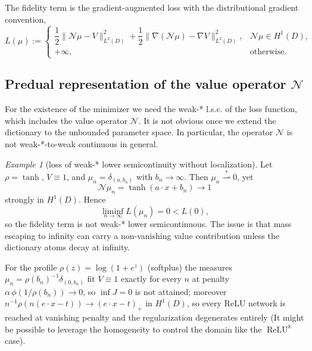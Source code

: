 \documentclass[11pt]{amsart}
\theoremstyle{definition}
\theoremstyle{remark}
\newtheorem{example}[theorem]{Example}
\DeclareMathOperator{\relu}{ReLU}
\newcommand{\reluk}{\relu^{k}}
\begin{document}
The fidelity term is the gradient-augmented loss with the distributional
gradient convention,
\begin{equation*}
	L(\mu) :=
	\begin{cases}
	\dfrac{1}{2} \|\mathcal{N}\mu - V \|^2_{L^2(D)}
	+ \dfrac{1}{2} \|\nabla(\mathcal{N}\mu) - \nabla V \|_{L^2(D)}^2,
	& \mathcal{N}\mu \in H^1(D),\\[4pt]
	+\infty, & \text{otherwise.}
	\end{cases}
\end{equation*}

  

\subsection{Predual representation of the value operator \texorpdfstring{$\mathcal{N}$}{N}}
For the existence of the minimizer we need the weak-* l.s.c. of the loss function, which includes the value operator $\mathcal{N}$.
It is not obvious once we extend the dictionary to the unbounded parameter space. 
In particular, the operator $\mathcal{N}$ is not weak-*-to-weak continuous in general. \par

\begin{example}[loss of weak-* lower semicontinuity without localization]
\label{ex:tanh_escape}
Let $\rho = \tanh$, $V \equiv 1$, and
$\mu_n = \delta_{(a, b_n)}$ with $b_n \to \infty$. Then
$\mu_n \overset{*}{\rightharpoonup} 0$, yet
\begin{equation*}
	\mathcal{N}\mu_n = \tanh(a \cdot x + b_n) \to 1
\end{equation*}
strongly in $H^1(D)$. Hence
\begin{equation*}
	\liminf_{n\to\infty} L(\mu_n) = 0 < L(0),
\end{equation*}
so the fidelity term is not weak-* lower semicontinuous. The issue is that
mass escaping to infinity can carry a non-vanishing value contribution unless
the dictionary atoms decay at infinity. \par 

For the profile $\rho(z) = \log(1 + e^z)$ (softplus) the measures
$\mu_n = \rho(b_n)^{-1}\delta_{(0, b_n)}$ fit $V \equiv 1$ exactly for every
$n$ at penalty $\alpha\,\phi(1/\rho(b_n)) \to 0$, so $\inf J = 0$ is not
attained; moreover $n^{-1}\rho(n(e \cdot x - t)) \to (e \cdot x - t)_+$ in
$H^1(D)$, so every ReLU network is reached at vanishing penalty and the
regularization degenerates entirely 
(It might be possible to leverage the homogeneity to control the domain like the $\reluk$ case). 
\end{example}
\end{document}

